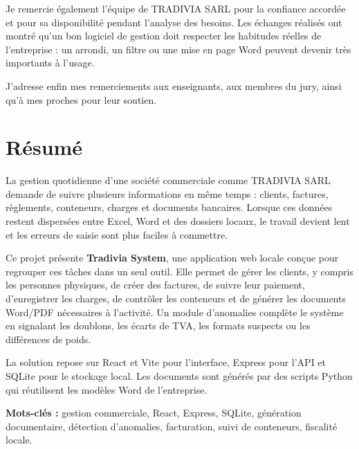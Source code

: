 \documentclass[12pt,a4paper,oneside]{report}
\newcommand{\Entreprise}{TRADIVIA SARL}
\begin{document}
Je remercie également l'équipe de \Entreprise{} pour la confiance accordée et pour sa disponibilité pendant l'analyse des besoins. Les échanges réalisés ont montré qu'un bon logiciel de gestion doit respecter les habitudes réelles de l'entreprise : un arrondi, un filtre ou une mise en page Word peuvent devenir très importants à l'usage.

J'adresse enfin mes remerciements aux enseignants, aux membres du jury, ainsi qu'à mes proches pour leur soutien.

\chapter*{Résumé}
La gestion quotidienne d'une société commerciale comme \Entreprise{} demande de suivre plusieurs informations en même temps : clients, factures, règlements, conteneurs, charges et documents bancaires. Lorsque ces données restent dispersées entre Excel, Word et des dossiers locaux, le travail devient lent et les erreurs de saisie sont plus faciles à commettre.

Ce projet présente \textbf{Tradivia System}, une application web locale conçue pour regrouper ces tâches dans un seul outil. Elle permet de gérer les clients, y compris les personnes physiques, de créer des factures, de suivre leur paiement, d'enregistrer les charges, de contrôler les conteneurs et de générer les documents Word/PDF nécessaires à l'activité. Un module d'anomalies complète le système en signalant les doublons, les écarts de TVA, les formats suspects ou les différences de poids.

La solution repose sur React et Vite pour l'interface, Express pour l'API et SQLite pour le stockage local. Les documents sont générés par des scripts Python qui réutilisent les modèles Word de l'entreprise.

\textbf{Mots-clés :} gestion commerciale, React, Express, SQLite, génération documentaire, détection d'anomalies, facturation, suivi de conteneurs, fiscalité locale.
\end{document}
